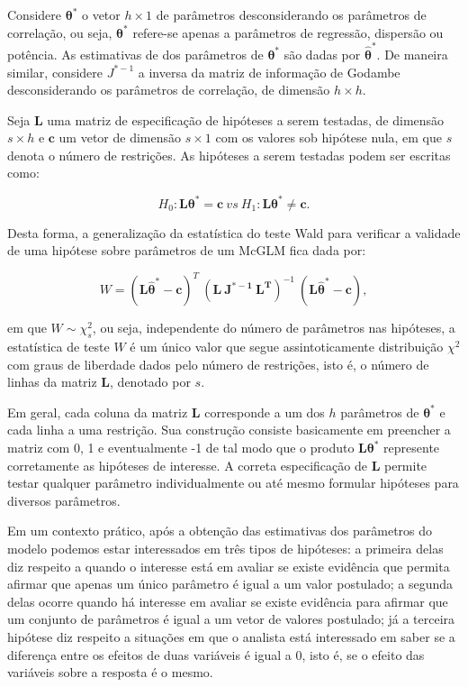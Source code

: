 Considere $\boldsymbol{\theta^{*}}$ o vetor $h \times 1$ de parâmetros desconsiderando os parâmetros de correlação, ou seja, $\boldsymbol{\theta^{*}}$ refere-se apenas a parâmetros de regressão, dispersão ou potência. As estimativas de dos parâmetros de $\boldsymbol{\theta^{*}}$ são dadas por $\boldsymbol{\hat\theta^{*}}$. De maneira similar, considere $J^{\boldsymbol{*}-1}$ a inversa da matriz de informação de Godambe desconsiderando os parâmetros de correlação, de dimensão $h \times h$.

Seja $\boldsymbol{L}$ uma matriz de especificação de hipóteses a serem testadas, de dimensão $s \times h$ e $\boldsymbol{c}$ um vetor de dimensão $s \times 1$ com os valores sob hipótese nula, em que $s$ denota o número de restrições. As hipóteses a serem testadas podem ser escritas como:

\begin{equation}
\label{eq:hipoteses_wald}
H_0: \boldsymbol{L}\boldsymbol{\theta^{*}} = \boldsymbol{c} \ vs \ H_1: \boldsymbol{L}\boldsymbol{\theta^{*}} \neq \boldsymbol{c}. 
\end{equation}

\noindent Desta forma, a generalização da estatística do teste Wald para verificar a validade de uma hipótese sobre parâmetros de um McGLM fica dada por:

$$
W = (\boldsymbol{L\hat\theta^{*}} - \boldsymbol{c})^T \ (\boldsymbol{L \ J^{\boldsymbol{*}-1} \ L^T})^{-1} \ (\boldsymbol{L\hat\theta^{*}} - \boldsymbol{c}),
$$

\noindent em que $W \sim \chi^2_s$, ou seja, independente do número de parâmetros nas hipóteses, a estatística de teste $W$ é um único valor que segue assintoticamente distribuição $\chi^2$ com graus de liberdade dados pelo número de restrições, isto é, o número de linhas da matriz $\boldsymbol{L}$, denotado por $s$.

Em geral, cada coluna da matriz $\boldsymbol{L}$ corresponde a um dos $h$ parâmetros de $\boldsymbol{\theta^{*}}$ e cada linha a uma restrição. Sua construção consiste basicamente em preencher a matriz com 0, 1 e eventualmente -1 de tal modo que o produto $\boldsymbol{L}\boldsymbol{\theta^{*}}$ represente corretamente as hipóteses de interesse. A correta especificação de $\boldsymbol{L}$ permite testar qualquer parâmetro individualmente ou até mesmo formular hipóteses para diversos parâmetros.

Em um contexto prático, após a obtenção das estimativas dos parâmetros do modelo podemos estar interessados em três tipos de hipóteses: a primeira delas diz respeito a quando o interesse está em avaliar se existe evidência que permita afirmar que apenas um único parâmetro é igual a um valor postulado; a segunda delas ocorre quando há interesse em avaliar se existe evidência para afirmar que um conjunto de parâmetros é igual a um vetor de valores postulado; já a terceira hipótese diz respeito a situações em que o analista está interessado em saber se a diferença entre os efeitos de duas variáveis é igual a 0, isto é, se o efeito das variáveis sobre a resposta é o mesmo.

